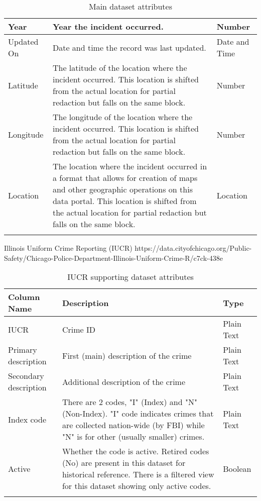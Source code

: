 \begin{center}
\begin{longtable}{|m{6em}|m{18em}|m{7em}|}
    \hline
        Year & 
        Year the incident occurred. & 
        Number\\
    \hline
        Updated On & 
        Date and time the record was last updated. & 
        Date and Time\\
    \hline
        Latitude & 
        The latitude of the location where the incident occurred. This location is shifted 
        from the actual location for partial redaction but falls on the same block. & 
        Number\\
    \hline
        Longitude & 
        The longitude of the location where the incident occurred. This location is shifted 
        from the actual location for partial redaction but falls on the same block. & 
        Number\\
    \hline
        Location & 
        The location where the incident occurred in a format that allows for creation of 
        maps and other geographic operations on this data portal. This location is shifted 
        from the actual location for partial redaction but falls on the same block. & 
        Location\\
    \hline
\caption{Main dataset attributes}
\end{longtable}
\end{center}

Illinois Uniform Crime Reporting (IUCR) \newline
https://data.cityofchicago.org/Public-Safety/Chicago-Police-Department-Illinois-Uniform-Crime-R/c7ck-438e
\begin{center}
\begin{longtable}{|m{6em}|m{18em}|m{7em}|}
    \hline
    Column Name & 
    Description & 
    Type\\
    \hline
    IUCR & 
    Crime ID & 
    Plain Text\\
    \hline
    Primary description & 
    First (main) description of the crime & 
    Plain Text\\
    \hline
    Secondary description & 
    Additional description of the crime & 
    Plain Text\\
    \hline
    Index code & 
    There are 2 codes, "I" (Index) and "N" (Non-Index). "I" code indicates crimes that are collected nation-wide (by FBI) while "N" is for other (usually smaller) crimes. & 
    Plain Text\\
    \hline
    Active & 
    Whether the code is active. Retired codes (No) are present in this dataset for historical reference. There is a filtered view for this dataset showing only active codes. & 
    Boolean\\
    \hline
\caption{IUCR supporting dataset attributes}
\end{longtable}
\end{center}

